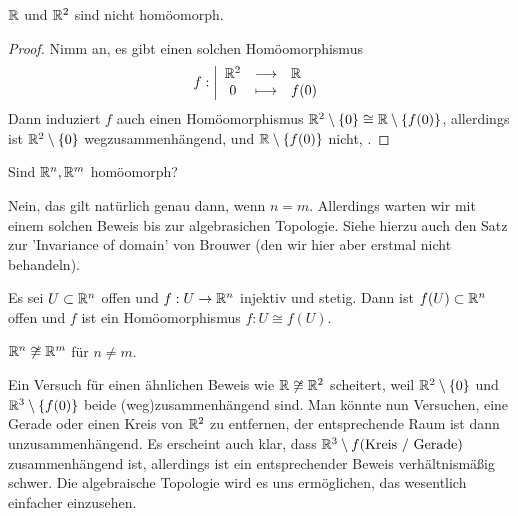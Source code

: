 \begin{corollary}\label{cor:R-und-R2-sind-nicht-homöomorph}
    $\mathbb{R}$ und $\mathbb{R}^2$ sind nicht homöomorph.
\end{corollary}
\begin{proof}
    Nimm an, es gibt einen solchen Homöomorphismus
        \begin{equation*}
        f: \left| \begin{array}{c c l} 
        \mathbb{R}^2 & \longrightarrow & \mathbb{R} \\
        0 & \longmapsto &  f(0)
        \end{array} \right.
    \end{equation*}
    Dann induziert $f$ auch einen Homöomorphismus $\mathbb{R}^2 \setminus \left \{0\right\} \cong \mathbb{R} \setminus \left \{f(0)\right\} $, allerdings ist $\mathbb{R}^2 \setminus \left \{0\right\} $ wegzusammenhängend, und $\mathbb{R} \setminus \left \{f(0)\right\} $ nicht, \contra.
\end{proof}

\begin{question}
    Sind $\mathbb{R}^n, \mathbb{R}^m$ homöomorph?
\end{question}

\begin{answer}
    Nein, das gilt natürlich genau dann, wenn $n = m$. Allerdings warten wir mit einem solchen Beweis bis zur algebrasichen Topologie. Siehe hierzu auch den Satz zur 'Invariance of domain' von Brouwer (den wir hier aber erstmal nicht behandeln).
    \begin{theorem**}
        Es sei $U\subset \mathbb{R}^n$ offen und $f: U \to  \mathbb{R}^n$ injektiv und stetig. Dann ist $f(U)\subset \mathbb{R}^n$ offen und $f$ ist ein Homöomorphismus  $f: U \cong f(U)$.
    \end{theorem**}
    \begin{corollary**}
        $\mathbb{R}^n \not \cong \mathbb{R}^m$ für $n\neq m$.
    \end{corollary**}
\end{answer}

Ein Versuch für einen ähnlichen Beweis wie $\mathbb{R} \not \cong \mathbb{R}^2$ scheitert, weil $\mathbb{R}^2 \setminus \left \{0\right\}$ und $\mathbb{R}^3 \setminus \left \{f(0)\right\} $ beide (weg)zusammenhängend sind. Man könnte nun Versuchen, eine Gerade oder einen Kreis von $\mathbb{R}^2$ zu entfernen, der entsprechende Raum ist dann unzusammenhängend. Es erscheint auch klar, dass $\mathbb{R}^3 \setminus f(\text{Kreis / Gerade})$ zusammenhängend ist, allerdings ist ein entsprechender Beweis verhältnismäßig schwer. Die algebraische Topologie wird es uns ermöglichen, das wesentlich einfacher einzusehen.

